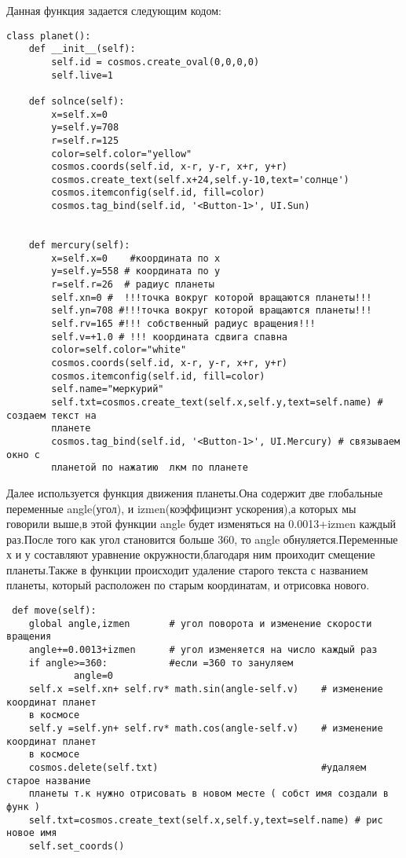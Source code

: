 \documentclass[11pt,a4paper]{report}
\begin{document}
Данная функция задается следующим кодом:
\begin{verbatim}
class planet():
    def __init__(self):
        self.id = cosmos.create_oval(0,0,0,0)
        self.live=1
        
    def solnce(self):
        x=self.x=0
        y=self.y=708
        r=self.r=125
        color=self.color="yellow"
        cosmos.coords(self.id, x-r, y-r, x+r, y+r)
        cosmos.create_text(self.x+24,self.y-10,text='солнце')
        cosmos.itemconfig(self.id, fill=color)
        cosmos.tag_bind(self.id, '<Button-1>', UI.Sun)
      
        
    def mercury(self):
        x=self.x=0    #координата по х
        y=self.y=558 # координата по у
        r=self.r=26  # радиус планеты
        self.xn=0 #  !!!точка вокруг которой вращаются планеты!!!
        self.yn=708 #!!!точка вокруг которой вращаются планеты!!!
        self.rv=165 #!!! собственный радиус вращения!!!
        self.v=+1.0 # !!! координата сдвига спавна 
        color=self.color="white"
        cosmos.coords(self.id, x-r, y-r, x+r, y+r)
        cosmos.itemconfig(self.id, fill=color) 
        self.name="меркурий"
        self.txt=cosmos.create_text(self.x,self.y,text=self.name) # создаем текст на 
        планете
        cosmos.tag_bind(self.id, '<Button-1>', UI.Mercury) # связываем окно с 
        планетой по нажатию  лкм по планете
\end{verbatim}
Далее используется функция движения планеты.Она содержит две глобальные переменные angle(угол), и izmen(коэффициэнт ускорения),а которых мы говорили выше,в этой функции angle будет изменяться на 0.0013+izmen каждый раз.После того как угол становится больше 360, то angle обнуляется.Переменные х и у составляют уравнение окружности,благодаря ним проиходит смещение планеты.Также в функции происходит удаление старого текста с названием планеты, который расположен по старым координатам, и отрисовка нового.

\begin{verbatim}
 def move(self):
    global angle,izmen       # угол поворота и изменение скорости вращения 
    angle+=0.0013+izmen      # угол изменяется на число каждый раз
    if angle>=360:           #если =360 то зануляем
            angle=0
    self.x =self.xn+ self.rv* math.sin(angle-self.v)    # изменение координат планет 
    в космосе 
    self.y =self.yn+ self.rv* math.cos(angle-self.v)    # изменение координат планет 
    в космосе
    cosmos.delete(self.txt)                             #удаляем старое название 
    планеты т.к нужно отрисовать в новом месте ( собст имя создали в функ )
    self.txt=cosmos.create_text(self.x,self.y,text=self.name) # рис новое имя
    self.set_coords()   
\end{verbatim}
\end{document}
